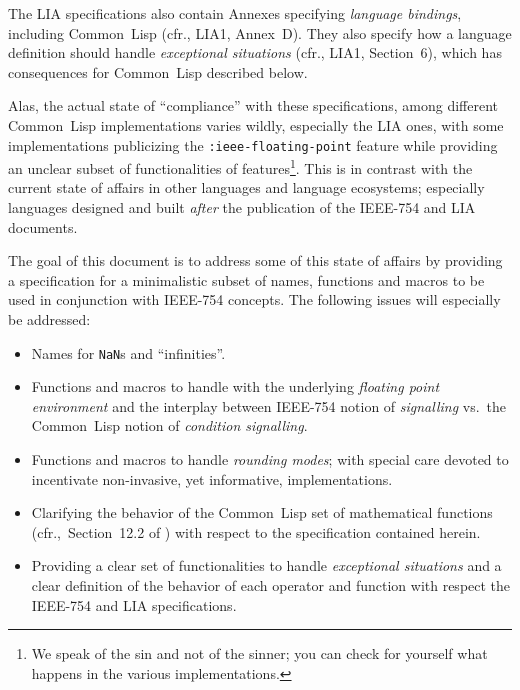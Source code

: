 \documentclass[10pt,fleqn]{article}
\newcommand{\CL}{\textsf{Common~Lisp}}
\newcommand{\marginnote}[1]{%
\marginpar{\begin{small}\begin{em}
{\raggedright #1}
\end{em}\end{small}}}
\newcommand{\code}[1]{\texttt{#1}}
\newcommand{\clterm}[1]{\textit{#1}}
\newcommand{\IEEEFPStd}{IEEE-754}
\begin{document}
\vspace*{3mm}

\noindent
The LIA specifications also contain Annexes specifying \emph{language
  bindings}, including \CL{} (cfr., LIA1, Annex~D).  They also specify
how a language definition should handle \emph{exceptional situations}
(cfr., LIA1, Section~6), which has consequences for \CL{} described
below.

\vspace*{3mm}

\noindent
Alas, the actual state of ``compliance'' with these specifications,
among different \CL{} implementations varies wildly, especially the
LIA ones, with some implementations publicizing the
\code{:ieee-floating-point} feature while providing an unclear subset
of functionalities of features\footnote{We speak of the sin and not of
  the sinner; you can check for yourself what happens in the various
  implementations.}.  This is in contrast with the current state of
affairs in other languages and language ecosystems; especially
languages designed and built \emph{after} the publication of the
\IEEEFPStd{} and LIA documents.

\vspace*{3mm}

The goal of this document is to address some of this state of affairs
by providing a specification for a minimalistic subset of
names,\marginnote{Not very ``minimalistic'' anymore\ldots}
functions and macros to be used in conjunction with \IEEEFPStd{}
concepts.  The following issues will especially 
be addressed:
\begin{itemize}
\item Names for \code{NaN}s and ``infinities''.
  
\item Functions and macros to handle with the underlying
  \emph{floating point environment} and the interplay between \IEEEFPStd{}
  notion of \emph{signalling} vs.~the \CL{} notion of
  \clterm{condition signalling}.
  
\item Functions and macros to handle \emph{rounding modes}; with
  special care devoted to incentivate non-invasive, yet informative,
  implementations.
  
\item Clarifying the behavior of the \CL{} set of mathematical
  functions (cfr.,~Section~12.2 of \cite{1996:ANSIHyperSpec}) with respect
  to the specification contained herein.

\item Providing a clear set of functionalities to handle
  \emph{exceptional situations} and a clear definition of the behavior
  of each operator and function with respect the \IEEEFPStd{} and LIA
  specifications.
\end{itemize}
\end{document}

